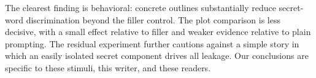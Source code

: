 The clearest finding is behavioral: concrete outlines substantially reduce secret-word discrimination beyond the filler control. The plot comparison is less decisive, with a small effect relative to filler and weaker evidence relative to plain prompting. The residual experiment further cautions against a simple story in which an easily isolated secret component drives all leakage. Our conclusions are specific to these stimuli, this writer, and these readers.

